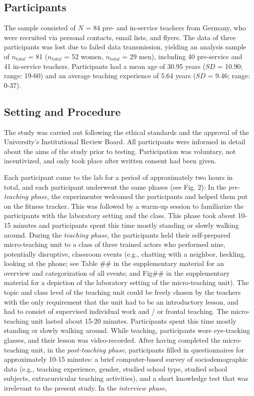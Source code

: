 \documentclass[preprint, 3p,
sort,]{elsarticle} %
\begin{document}
\subsection{Participants}\label{participants}

The sample consisted of \(N\) = 84 pre- and in-service teachers from
Germany, who were recruited via personal contacts, email lists, and
flyers. The data of three participants was lost due to failed data
transmission, yielding an analysis sample of \(n_{total}\) = 81
(\(n_{total}\) = 52 women, \(n_{total}\) = 29 men), including 40
pre-service and 41 in-service teachers. Participants had a mean age of
30.95 years (\(SD\) = 10.90; range: 19-60) and an average teaching
experience of 5.64 years (\(SD\) = 9.46; range: 0-37).

\subsection{Setting and Procedure}\label{setting-and-procedure}

The study was carried out following the ethical standards and the
approval of the University's Institutional Review Board. All
participants were informed in detail about the aims of the study prior
to testing. Participation was voluntary, not incentivized, and only took
place after written consent had been given.

Each participant came to the lab for a period of approximately two hours
in total, and each participant underwent the same phases (see Fig. 2):
In the \emph{pre-teaching phase}, the experimenter welcomed the
participants and helped them put on the fitness tracker. This was
followed by a warm-up session to familiarize the participants with the
laboratory setting and the class. This phase took about 10-15 minutes
and participants spent this time mostly standing or slowly walking
around. During the \emph{teaching phase}, the participants held their
self-prepared micro-teaching unit to a class of three trained actors who
performed nine, potentially disruptive, classroom events (e.g., chatting
with a neighbor, heckling, looking at the phone; see Table \#\# in the
supplementary material for an overview and categorization of all events;
and Fig\#\# in the supplementary material for a depiction of the
laboratory setting of the micro-teaching unit). The topic and class
level of the teaching unit could be freely chosen by the teachers with
the only requirement that the unit had to be an introductory lesson, and
had to consist of supervised individual work and / or frontal teaching.
The micro-teaching unit lasted about 15-20 minutes. Participants spent
this time mostly standing or slowly walking around. While teaching,
participants wore eye-tracking glasses, and their lesson was
video-recorded. After having completed the micro-teaching unit, in the
\emph{post-teaching phase}, participants filled in questionnaires for
approximately 10-15 minutes: a brief computer-based survey of
sociodemographic data (e.g., teaching experience, gender, studied school
type, studied school subjects, extracurricular teaching activities), and
a short knowledge test that was irrelevant to the present study. In the
\emph{interview phase},
\end{document}
